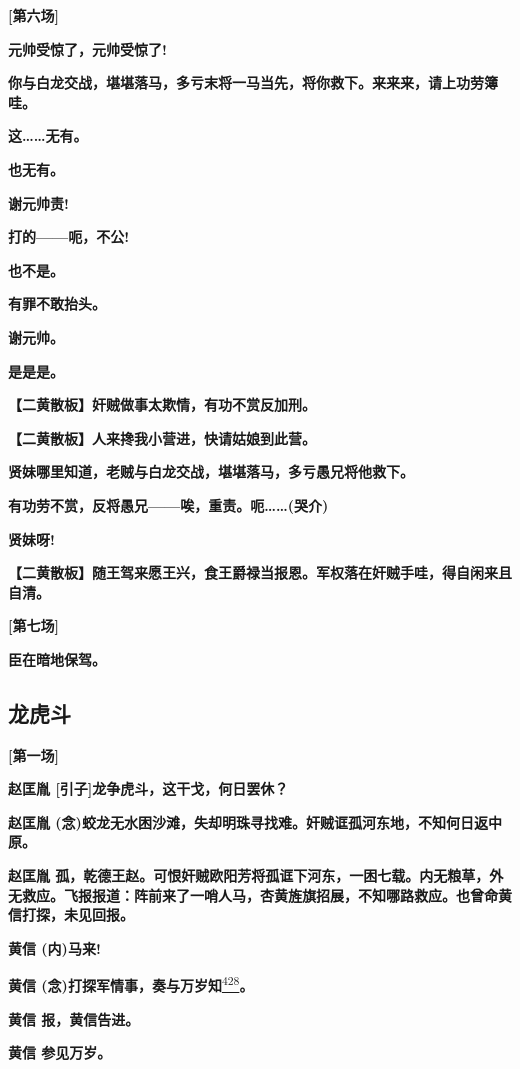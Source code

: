 \textbf{{[}第六场{]}}

\textbf{元帅受惊了，元帅受惊了!}

\textbf{你与白龙交战，堪堪落马，多亏末将一马当先，将你救下。来来来，请上功劳簿哇。}

\textbf{这\ldots{}\ldots{}无有。}

\textbf{也无有。}

\textbf{谢元帅责!}

\textbf{打的------呃，不公!}

\textbf{也不是。}

\textbf{有罪不敢抬头。}

\textbf{谢元帅。}

\textbf{是是是。}

\textbf{【二黄散板】奸贼做事太欺情，有功不赏反加刑。}

\textbf{【二黄散板】人来搀我小营进，快请姑娘到此营。}

\textbf{贤妹哪里知道，老贼与白龙交战，堪堪落马，多亏愚兄将他救下。}

\textbf{有功劳不赏，反将愚兄------唉，重责。呃\ldots{}\ldots{}(哭介)}

\textbf{贤妹呀!}

\textbf{【二黄散板】随王驾来愿王兴，食王爵禄当报恩。军权落在奸贼手哇，得自闲来且自清。}

\textbf{{[}第七场{]}}

\textbf{臣在暗地保驾。}

\hypertarget{ux9f99ux864eux6597}{%
\subsection{龙虎斗}\label{ux9f99ux864eux6597}}

\textbf{{[}第一场{]}}

\textbf{赵匡胤 {[}引子{]}龙争虎斗，这干戈，何日罢休？}

\textbf{赵匡胤
(念)蛟龙无水困沙滩，失却明珠寻找难。奸贼诓孤河东地，不知何日返中原。}

\textbf{赵匡胤
孤，乾德王赵。可恨奸贼欧阳芳将孤诓下河东，一困七载。内无粮草，外无救应。飞报报道：阵前来了一哨人马，杏黄旌旗招展，不知哪路救应。也曾命黄信打探，未见回报。}

\textbf{黄信 (内)马来!}

\textbf{黄信
(念)打探军情事，奏与万岁知}\protect\hyperlink{fn428}{\textsuperscript{428}}\textbf{。}

\textbf{黄信 报，黄信告进。}

\textbf{黄信 参见万岁。}

